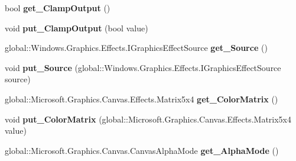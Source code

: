 \begin{DoxyCompactItemize}
bool {\bfseries get\+\_\+\+Clamp\+Output} ()
\item 
\mbox{\label{interface_microsoft_1_1_graphics_1_1_canvas_1_1_effects_1_1_i_color_matrix_effect_ac0b84a9c8932bab90011df716de57abc}} 
void {\bfseries put\+\_\+\+Clamp\+Output} (bool value)
\item 
\mbox{\label{interface_microsoft_1_1_graphics_1_1_canvas_1_1_effects_1_1_i_color_matrix_effect_a92c8a46f383c29807747e76c7a9dab74}} 
global\+::\+Windows.\+Graphics.\+Effects.\+I\+Graphics\+Effect\+Source {\bfseries get\+\_\+\+Source} ()
\item 
\mbox{\label{interface_microsoft_1_1_graphics_1_1_canvas_1_1_effects_1_1_i_color_matrix_effect_ad452b45320bc870760daae883acd5030}} 
void {\bfseries put\+\_\+\+Source} (global\+::\+Windows.\+Graphics.\+Effects.\+I\+Graphics\+Effect\+Source source)
\item 
\mbox{\label{interface_microsoft_1_1_graphics_1_1_canvas_1_1_effects_1_1_i_color_matrix_effect_a6d1376fefa6b4c96bab74f3eaa0098a5}} 
global\+::\+Microsoft.\+Graphics.\+Canvas.\+Effects.\+Matrix5x4 {\bfseries get\+\_\+\+Color\+Matrix} ()
\item 
\mbox{\label{interface_microsoft_1_1_graphics_1_1_canvas_1_1_effects_1_1_i_color_matrix_effect_a891c719e926fd98a742b1e49dfd5e99e}} 
void {\bfseries put\+\_\+\+Color\+Matrix} (global\+::\+Microsoft.\+Graphics.\+Canvas.\+Effects.\+Matrix5x4 value)
\item 
\mbox{\label{interface_microsoft_1_1_graphics_1_1_canvas_1_1_effects_1_1_i_color_matrix_effect_a38a2f04f4c349390c6709ea86049bb00}} 
global\+::\+Microsoft.\+Graphics.\+Canvas.\+Canvas\+Alpha\+Mode {\bfseries get\+\_\+\+Alpha\+Mode} ()
\item 
\mbox{\label{interface_microsoft_1_1_graphics_1_1_canvas_1_1_effects_1_1_i_color_matrix_effect_a19111c668130b4e202fdcf1b6370de85}} 

\end{DoxyCompactItemize}
